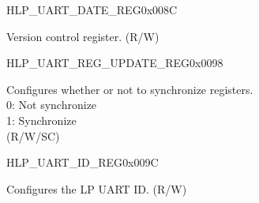 \begin{register}{H}{LP\_UART\_DATE\_REG}{0x008C}\label{regdesc:LPUARTDATEREG}
%
\regnewline%
\begin{regdesc}\begin{reglist}
\label{fielddesc:LPUARTDATE}\item [LP\_UART\_DATE] Version control register. (R/W)
\end{reglist}\end{regdesc}
\end{register}


\begin{register}{H}{LP\_UART\_REG\_UPDATE\_REG}{0x0098}\label{regdesc:LPUARTREGUPDATEREG}
%
%
\regnewline%
\begin{regdesc}\begin{reglist}
\label{fielddesc:LPUARTREGUPDATE}\item [LP\_UART\_REG\_UPDATE] Configures whether or not to synchronize registers.\\
0: Not synchronize\\
1: Synchronize\\(R/W/SC)
\end{reglist}\end{regdesc}
\end{register}


\begin{register}{H}{LP\_UART\_ID\_REG}{0x009C}\label{regdesc:LPUARTIDREG}
%
\regnewline%
\begin{regdesc}\begin{reglist}
\label{fielddesc:LPUARTID}\item [LP\_UART\_ID] Configures the LP UART ID. (R/W)
\end{reglist}\end{regdesc}
\end{register}


